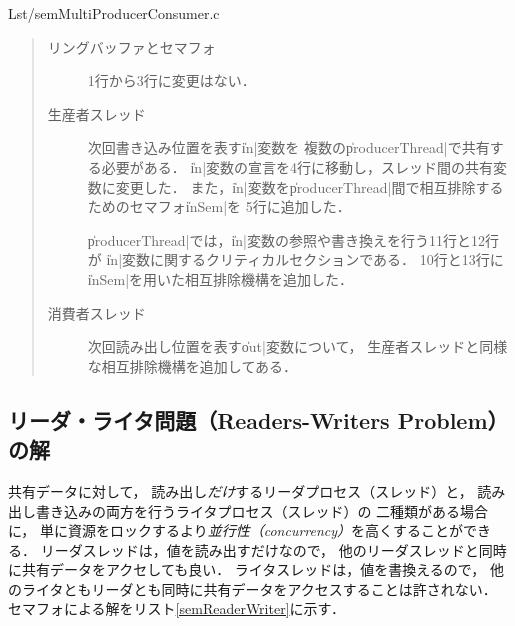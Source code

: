 
                {Lst/semMultiProducerConsumer.c}

\begin{quote}
  \begin{description}
  \item [リングバッファとセマフォ]
    1行から3行に変更はない．

  \item [生産者スレッド]
    次回書き込み位置を表す\|in|変数を
    複数の\|producerThread|で共有する必要がある．
    \|in|変数の宣言を4行に移動し，スレッド間の共有変数に変更した．
    また，\|in|変数を\|producerThread|間で相互排除するためのセマフォ\|inSem|を
    5行に追加した．

    \|producerThread|では，\|in|変数の参照や書き換えを行う11行と12行が
    \|in|変数に関するクリティカルセクションである．
    10行と13行に\|inSem|を用いた相互排除機構を追加した．

  \item [消費者スレッド]
    次回読み出し位置を表す\|out|変数について，
    生産者スレッドと同様な相互排除機構を追加してある．
  \end{description}
\end{quote}

\subsection{リーダ・ライタ問題（Readers-Writers Problem）の解}
\label{readersWritersProglem}
共有データに対して，
読み出し\emph{だけ}するリーダプロセス（スレッド）と，
読み出し書き込みの両方を行うライタプロセス（スレッド）の
二種類がある場合に，
単に資源をロックするより\emph{並行性（concurrency）}を高くすることができる．
リーダスレッドは，値を読み出すだけなので，
他のリーダスレッドと同時に共有データをアクセしても良い．
ライタスレッドは，値を書換えるので，
他のライタともリーダとも同時に共有データをアクセスすることは許されない．
セマフォによる解をリスト\ref{semReaderWriter}に示す．



